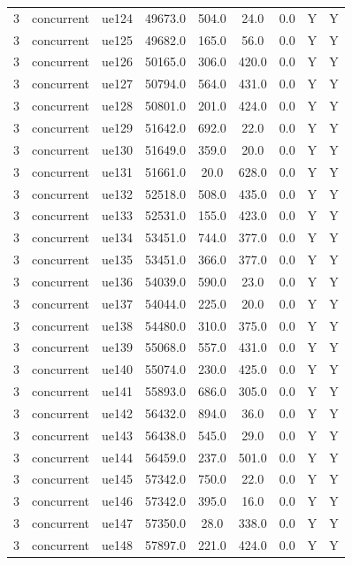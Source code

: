 \begin{table}[ht]
\begin{tabular}{|c|c|c|c|c|c|c|c|c|}
3 & concurrent & ue124 & 49673.0 & 504.0 & 24.0 & 0.0 & Y & Y \\
3 & concurrent & ue125 & 49682.0 & 165.0 & 56.0 & 0.0 & Y & Y \\
3 & concurrent & ue126 & 50165.0 & 306.0 & 420.0 & 0.0 & Y & Y \\
3 & concurrent & ue127 & 50794.0 & 564.0 & 431.0 & 0.0 & Y & Y \\
3 & concurrent & ue128 & 50801.0 & 201.0 & 424.0 & 0.0 & Y & Y \\
3 & concurrent & ue129 & 51642.0 & 692.0 & 22.0 & 0.0 & Y & Y \\
3 & concurrent & ue130 & 51649.0 & 359.0 & 20.0 & 0.0 & Y & Y \\
3 & concurrent & ue131 & 51661.0 & 20.0 & 628.0 & 0.0 & Y & Y \\
3 & concurrent & ue132 & 52518.0 & 508.0 & 435.0 & 0.0 & Y & Y \\
3 & concurrent & ue133 & 52531.0 & 155.0 & 423.0 & 0.0 & Y & Y \\
3 & concurrent & ue134 & 53451.0 & 744.0 & 377.0 & 0.0 & Y & Y \\
3 & concurrent & ue135 & 53451.0 & 366.0 & 377.0 & 0.0 & Y & Y \\
3 & concurrent & ue136 & 54039.0 & 590.0 & 23.0 & 0.0 & Y & Y \\
3 & concurrent & ue137 & 54044.0 & 225.0 & 20.0 & 0.0 & Y & Y \\
3 & concurrent & ue138 & 54480.0 & 310.0 & 375.0 & 0.0 & Y & Y \\
3 & concurrent & ue139 & 55068.0 & 557.0 & 431.0 & 0.0 & Y & Y \\
3 & concurrent & ue140 & 55074.0 & 230.0 & 425.0 & 0.0 & Y & Y \\
3 & concurrent & ue141 & 55893.0 & 686.0 & 305.0 & 0.0 & Y & Y \\
3 & concurrent & ue142 & 56432.0 & 894.0 & 36.0 & 0.0 & Y & Y \\
3 & concurrent & ue143 & 56438.0 & 545.0 & 29.0 & 0.0 & Y & Y \\
3 & concurrent & ue144 & 56459.0 & 237.0 & 501.0 & 0.0 & Y & Y \\
3 & concurrent & ue145 & 57342.0 & 750.0 & 22.0 & 0.0 & Y & Y \\
3 & concurrent & ue146 & 57342.0 & 395.0 & 16.0 & 0.0 & Y & Y \\
3 & concurrent & ue147 & 57350.0 & 28.0 & 338.0 & 0.0 & Y & Y \\
3 & concurrent & ue148 & 57897.0 & 221.0 & 424.0 & 0.0 & Y & Y \\

\end{tabular}
\end{table}

